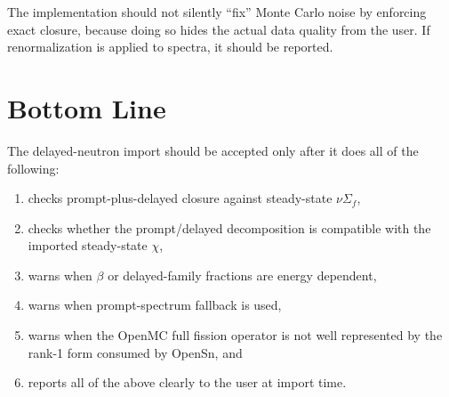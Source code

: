 \documentclass[11pt]{article}
\begin{document}
The implementation should not silently ``fix'' Monte Carlo noise by enforcing exact closure,
because doing so hides the actual data quality from the user. If renormalization is applied to
spectra, it should be reported.

\section{Bottom Line}

The delayed-neutron import should be accepted only after it does all of the following:
\begin{enumerate}[label=\arabic*.]
  \item checks prompt-plus-delayed closure against steady-state \(\nu \Sigma_f\),
  \item checks whether the prompt/delayed decomposition is compatible with the imported
  steady-state \(\chi\),
  \item warns when \(\beta\) or delayed-family fractions are energy dependent,
  \item warns when prompt-spectrum fallback is used,
  \item warns when the OpenMC full fission operator is not well represented by the rank-1
  form consumed by OpenSn, and
  \item reports all of the above clearly to the user at import time.
\end{enumerate}
\end{document}
